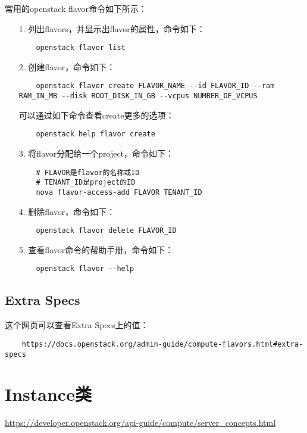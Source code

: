 \documentclass[a4paper,left=1.5cm,right=1.5cm,11pt]{article}
\begin{document}
    常用的openstack flavor命令如下所示：
    \begin{itemize}
        \item[1.] 列出flavors，并显示出flavor的属性，命令如下：
        \begin{lstlisting}
    openstack flavor list
        \end{lstlisting}

        \item[2.] 创建flavor，命令如下：
        \begin{lstlisting}
    openstack flavor create FLAVOR_NAME --id FLAVOR_ID --ram RAM_IN_MB --disk ROOT_DISK_IN_GB --vcpus NUMBER_OF_VCPUS
        \end{lstlisting}

        可以通过如下命令查看create更多的选项：
        \begin{lstlisting}
    openstack help flavor create
        \end{lstlisting}

        \item[3.] 将flavor分配给一个project，命令如下：
        \begin{lstlisting}
    # FLAVOR是flavor的名称或ID
    # TENANT_ID是project的ID
    nova flavor-access-add FLAVOR TENANT_ID
        \end{lstlisting}

        \item[4.] 删除flavor，命令如下：
        \begin{lstlisting}
    openstack flavor delete FLAVOR_ID
        \end{lstlisting}

        \item[5.] 查看flavor命令的帮助手册，命令如下：
        \begin{lstlisting}
    openstack flavor --help
        \end{lstlisting}
    \end{itemize}

\subsection{Extra Specs}
    这个网页可以查看Extra Specs上的值：
    \begin{lstlisting}
    https://docs.openstack.org/admin-guide/compute-flavors.html#extra-specs
    \end{lstlisting}

\section{Instance类}
    \url{https://developer.openstack.org/api-guide/compute/server_concepts.html}
\end{document}
